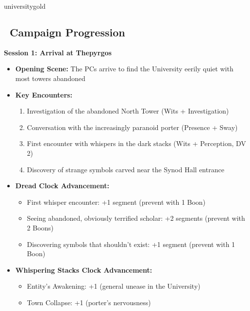 \documentclass[11pt]{article}
\begin{document}
\newpage

\begin{campaignsection}{universitygold}
\subsection*{\faBook\ Campaign Progression}

\textbf{Session 1: Arrival at Thepyrgos}
\begin{itemize}
    \item \textbf{Opening Scene:} The PCs arrive to find the University eerily quiet with most towers abandoned
    \item \textbf{Key Encounters:}
    \begin{enumerate}
        \item Investigation of the abandoned North Tower (Wits + Investigation)
        \item Conversation with the increasingly paranoid porter (Presence + Sway)
        \item First encounter with whispers in the dark stacks (Wits + Perception, DV 2)
        \item Discovery of strange symbols carved near the Synod Hall entrance
    \end{enumerate}
    \item \textbf{Dread Clock Advancement:}
    \begin{itemize}
        \item First whisper encounter: +1 segment (prevent with 1 Boon)
        \item Seeing abandoned, obviously terrified scholar: +2 segments (prevent with 2 Boons)
        \item Discovering symbols that shouldn't exist: +1 segment (prevent with 1 Boon)
    \end{itemize}
    \item \textbf{Whispering Stacks Clock Advancement:}
    \begin{itemize}
        \item Entity's Awakening: +1 (general unease in the University)
        \item Town Collapse: +1 (porter's nervousness)
    \end{itemize}
\end{itemize}


\end{campaignsection}
\end{document}
